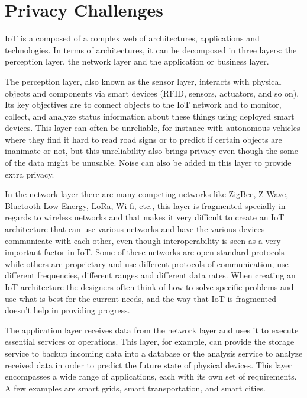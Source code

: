 \documentclass[conference]{IEEEtran}
\begin{document}
\section{Privacy Challenges}

IoT is a composed of a complex web of architectures, applications and
technologies. In terms of architectures, it can be decomposed in three
layers: the perception layer, the network layer and the application or
business layer.

The perception layer, also known as the sensor layer, interacts with physical
objects and components via smart devices (RFID, sensors, actuators, and so on).
Its key objectives are to connect objects to the IoT network and to monitor,
collect, and analyze status information about these things using deployed
smart devices. This layer can often be unreliable, for instance with autonomous
vehicles where they find it hard to read road signs or to predict if certain
objects are inanimate or not, but this unreliability also brings privacy
even though the some of the data might be unusable. Noise can also be added in
this layer to provide extra privacy.

In the network layer there are many competing networks like ZigBee, Z-Wave,
Bluetooth Low Energy, LoRa, Wi-fi, etc., this layer is fragmented specially
in regards to wireless networks and that makes it very difficult to create
an IoT architecture that can use various networks and have the various
devices communicate with each other, even though interoperability is seen
as a very important factor in IoT. Some of these networks are open standard
protocols while others are proprietary and use different protocols of communication,
use different frequencies, different ranges and different data rates. When
creating an IoT architecture the designers often think of how to solve
specific problems and use what is best for the current needs, and the way
that IoT is fragmented doesn't help in providing progress.

The application layer receives data from the network layer and uses it to
execute essential services or operations. This layer, for example, can provide
the storage service to backup incoming data into a database or the analysis
service to analyze received data in order to predict the future state of
physical devices. This layer encompasses a wide range of applications,
each with its own set of requirements. A few examples are smart grids,
smart transportation, and smart cities.
\end{document}
